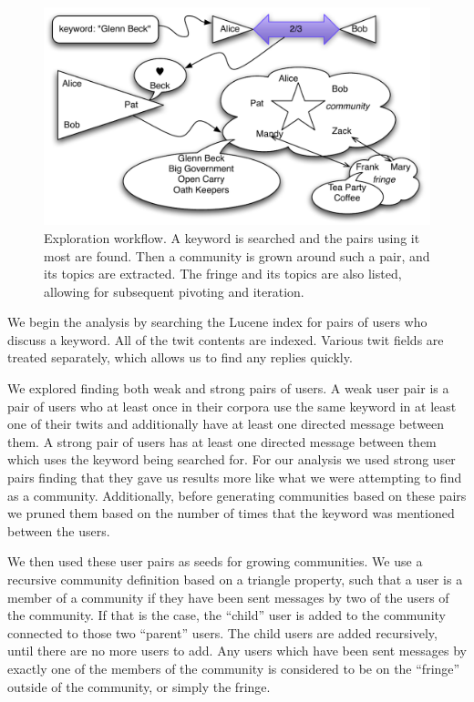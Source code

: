 \documentclass[10pt,oneside]{memoir}
\begin{document}
\begin{Spacing}{2}
\begin{figure}[htp]
\begin{center}
\includegraphics[width=6in]{figures/spie-workflow}
\caption{Exploration workflow.  A keyword is searched and the pairs using it most are found.  Then a community is grown around such a pair, and its topics are extracted.  The fringe and its topics are also listed, allowing for subsequent pivoting and iteration.}
\label{figure:spie-workflow}
\end{center}
\end{figure}
We begin the analysis by searching the Lucene index for pairs of
users who discuss a keyword. All of the twit contents are indexed.
Various twit fields are treated separately, which allows us to find
any replies quickly.


We explored finding both weak and strong pairs of users. A weak
user pair is a pair of users who at least once in their corpora use
the same keyword in at least one of their twits and additionally
have at least one directed message between them. A strong pair of
users has at least one directed message between them which uses the
keyword being searched for. For our analysis we used strong user
pairs finding that they gave us results more like what we were
attempting to find as a community. Additionally, before generating
communities based on these pairs we pruned them based on the number
of times that the keyword was mentioned between the users.


We then used these user pairs as seeds for growing communities. We
use a recursive community definition based on a triangle property,
such that a user is a member of a community if they have been sent
messages by two of the users of the community. If that is the case,
the ``child'' user is added to the community connected to those two
``parent'' users. The child users are added recursively, until there
are no more users to add. Any users which have been sent messages
by exactly one of the members of the community is considered to be
on the ``fringe'' outside of the community, or simply the fringe.



\end{Spacing}
\end{document}
